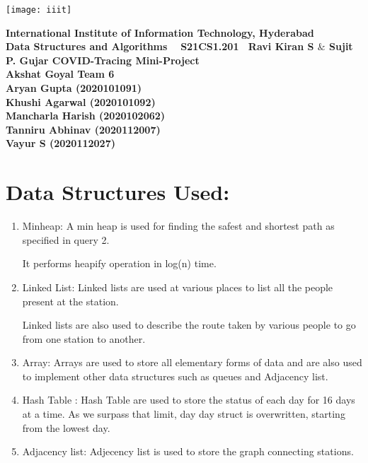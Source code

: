 \documentclass{article}
\begin{document}
\begin{titlepage}

\centering
\vfill
\texttt{[image: iiit]}
\vskip1cm

{\bfseries\Large
		International Institute of Information Technology, Hyderabad\\
        \vskip0.5cm
        Data Structures and Algorithms \
        \vskip1cm
        S21CS1.201\
        \vskip0.5cm
        Ravi Kiran S $\&$ Sujit P. Gujar 
        \vskip2cm
        COVID-Tracing Mini-Project\\
        \vskip0.5cm
        Akshat Goyal
        \vskip0.5cm
       Team 6}\\
        \vskip 1cm
{\bfseries      
    Aryan Gupta (2020101091)\\
        \vskip 0.5cm
        Khushi Agarwal (2020101092)\\
        \vskip 0.5cm
        Mancharla Harish (2020102062)\\
        \vskip 0.5cm
        Tanniru Abhinav (2020112007)\\
        \vskip 0.5cm
        Vayur S (2020112027)}
    


\end{titlepage}
\newpage

\section{Data Structures Used:}

\begin{enumerate}
    \item Minheap: A min heap is used for finding the safest and shortest path as specified in query 2.
    
	It performs heapify operation in log(n) time.
    \item Linked List: Linked lists are used at various places to list all the people present at the station.
	
	Linked lists are also used to describe the route taken by various people to go from one station to another.
    \item Array: Arrays are used to store all elementary forms of data and are also used to implement other data structures such as queues and Adjacency list.
    \item Hash Table : Hash Table are used to store the status of each day for 16 days at a time. As we surpass that limit, day day struct is overwritten, starting from the lowest day.
    \item Adjacency list:
	Adjecency list is used to store the graph connecting stations.

\end{enumerate}
\end{document}
